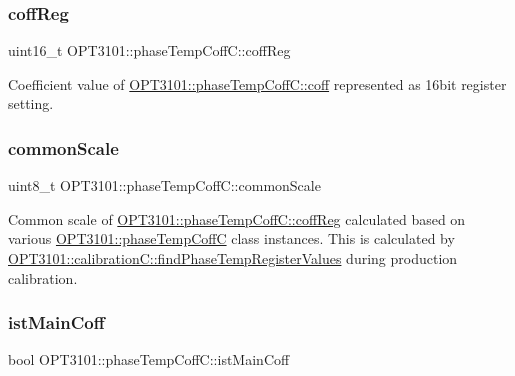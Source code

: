 \subsubsection{\texorpdfstring{coff\+Reg}{coffReg}}
{\footnotesize\ttfamily uint16\+\_\+t O\+P\+T3101\+::phase\+Temp\+Coff\+C\+::coff\+Reg}



Coefficient value of \mbox{\hyperlink{class_o_p_t3101_1_1phase_temp_coff_c_ade7d29c7cac1e63af7910eec0ec38043}{O\+P\+T3101\+::phase\+Temp\+Coff\+C\+::coff}} represented as 16bit register setting. 

\mbox{\label{class_o_p_t3101_1_1phase_temp_coff_c_a0f7646d71d058bc5354ac8f14270fcf3}} 
\subsubsection{\texorpdfstring{common\+Scale}{commonScale}}
{\footnotesize\ttfamily uint8\+\_\+t O\+P\+T3101\+::phase\+Temp\+Coff\+C\+::common\+Scale}



Common scale of \mbox{\hyperlink{class_o_p_t3101_1_1phase_temp_coff_c_a69e1782e097ce7ab761e4e55b5206f2e}{O\+P\+T3101\+::phase\+Temp\+Coff\+C\+::coff\+Reg}} calculated based on various \mbox{\hyperlink{class_o_p_t3101_1_1phase_temp_coff_c}{O\+P\+T3101\+::phase\+Temp\+CoffC}} class instances. This is calculated by \mbox{\hyperlink{class_o_p_t3101_1_1calibration_c_a5ca75c8e4d7818a90cacc0471522b365}{O\+P\+T3101\+::calibration\+C\+::find\+Phase\+Temp\+Register\+Values}} during production calibration. 

\mbox{\label{class_o_p_t3101_1_1phase_temp_coff_c_abcd691cfc4678e3588bc1b38600632e7}} 
\subsubsection{\texorpdfstring{ist\+Main\+Coff}{istMainCoff}}
{\footnotesize\ttfamily bool O\+P\+T3101\+::phase\+Temp\+Coff\+C\+::ist\+Main\+Coff}




